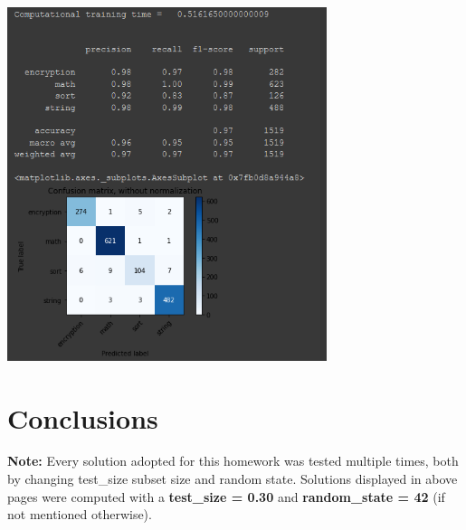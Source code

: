 \documentclass[11pt]{scrartcl}
\begin{document}
{\begin{center}
	\vspace{0.1cm}
	\hspace{+0.2in}\includegraphics[width=0.7\textwidth]{svm_matrix.png}
	\vspace{0.3cm}
\end{center}

\newpage
\section{Conclusions}
\hspace{-0.05in}\large{

\noindent
\textbf{\large{Note:}} \newline
Every solution adopted for this homework was tested multiple times, both by changing test\_size subset size and random state. Solutions displayed in above pages were computed with a \textbf{test\_size = 0.30} and \textbf{random\_state = 42} (if not mentioned otherwise).

\vspace{0.5cm}

}}
\end{document}
